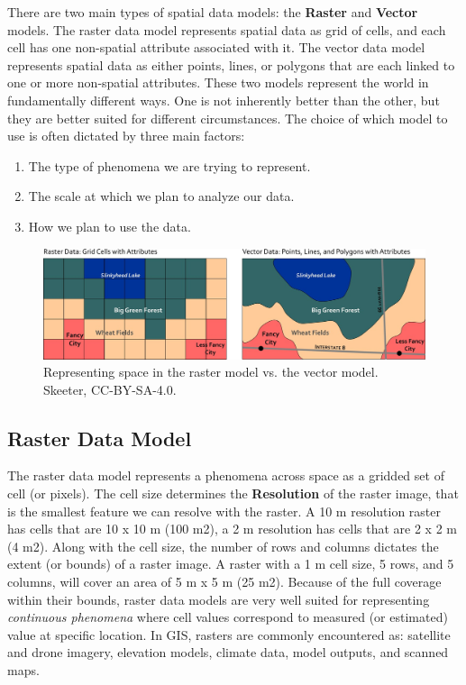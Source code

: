 \documentclass[
]{book}
\providecommand{\tightlist}{%
  \setlength{\itemsep}{0pt}\setlength{\parskip}{0pt}}
\begin{document}
There are two main types of spatial data models: the \textbf{Raster} and \textbf{Vector} models. The raster data model represents spatial data as grid of cells, and each cell has one non-spatial attribute associated with it. The vector data model represents spatial data as either points, lines, or polygons that are each linked to one or more non-spatial attributes. These two models represent the world in fundamentally different ways. One is not inherently better than the other, but they are better suited for different circumstances. The choice of which model to use is often dictated by three main factors:

\begin{enumerate}
\def\labelenumi{\arabic{enumi})}
\tightlist
\item
  The type of phenomena we are trying to represent.
\item
  The scale at which we plan to analyze our data.
\item
  How we plan to use the data.
\end{enumerate}

\begin{figure}
\includegraphics[width=0.75\linewidth]{images/03-vector-v-raster} \caption{Representing space in the raster model vs. the vector model. Skeeter, CC-BY-SA-4.0.}\label{fig:3-vector-v-raster}
\end{figure}

\subsection{Raster Data Model}\label{raster-data-model}

The raster data model represents a phenomena across space as a gridded set of cell (or pixels). The cell size determines the \textbf{Resolution} of the raster image, that is the smallest feature we can resolve with the raster. A 10 m resolution raster has cells that are 10 x 10 m (100 m2), a 2 m resolution has cells that are 2 x 2 m (4 m2). Along with the cell size, the number of rows and columns dictates the extent (or bounds) of a raster image. A raster with a 1 m cell size, 5 rows, and 5 columns, will cover an area of 5 m x 5 m (25 m2). Because of the full coverage within their bounds, raster data models are very well suited for representing \emph{continuous phenomena} where cell values correspond to measured (or estimated) value at specific location. In GIS, rasters are commonly encountered as: satellite and drone imagery, elevation models, climate data, model outputs, and scanned maps.
\end{document}
